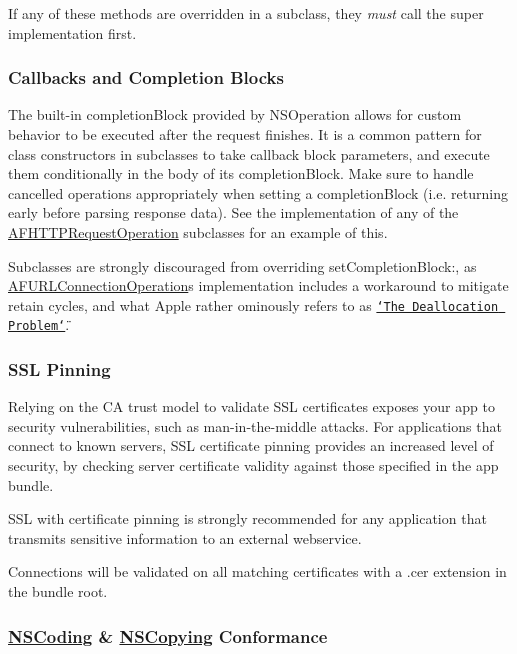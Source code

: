 If any of these methods are overridden in a subclass, they {\itshape must} call the {\ttfamily super} implementation first.

\subsubsection*{Callbacks and Completion Blocks}

The built-\/in {\ttfamily completion\+Block} provided by {\ttfamily N\+S\+Operation} allows for custom behavior to be executed after the request finishes. It is a common pattern for class constructors in subclasses to take callback block parameters, and execute them conditionally in the body of its {\ttfamily completion\+Block}. Make sure to handle cancelled operations appropriately when setting a {\ttfamily completion\+Block} (i.\+e. returning early before parsing response data). See the implementation of any of the {\ttfamily \mbox{\hyperlink{interface_a_f_h_t_t_p_request_operation}{A\+F\+H\+T\+T\+P\+Request\+Operation}}} subclasses for an example of this.

Subclasses are strongly discouraged from overriding {\ttfamily set\+Completion\+Block\+:}, as {\ttfamily \mbox{\hyperlink{interface_a_f_u_r_l_connection_operation}{A\+F\+U\+R\+L\+Connection\+Operation}}}\textquotesingle{}s implementation includes a workaround to mitigate retain cycles, and what Apple rather ominously refers to as \href{http://developer.apple.com/library/ios/#technotes/tn2109/}{\tt \char`\"{}\+The Deallocation Problem\char`\"{}}.

\subsubsection*{S\+SL Pinning}

Relying on the CA trust model to validate S\+SL certificates exposes your app to security vulnerabilities, such as man-\/in-\/the-\/middle attacks. For applications that connect to known servers, S\+SL certificate pinning provides an increased level of security, by checking server certificate validity against those specified in the app bundle.

S\+SL with certificate pinning is strongly recommended for any application that transmits sensitive information to an external webservice.

Connections will be validated on all matching certificates with a {\ttfamily .cer} extension in the bundle root.

\subsubsection*{\mbox{\hyperlink{class_n_s_coding-p}{N\+S\+Coding}} \& \mbox{\hyperlink{class_n_s_copying-p}{N\+S\+Copying}} Conformance}

